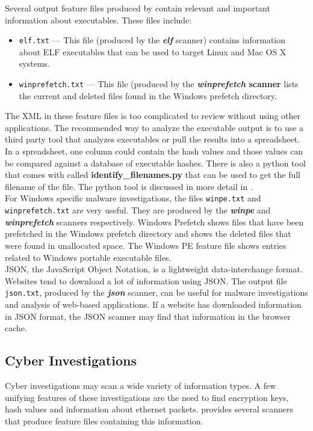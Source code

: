 \documentclass[11pt]{article} %
\begin{document}
Several output feature files produced by \bulk contain relevant and important information about executables. These files include:
\begin{itemize}
\item \texttt{elf.txt} --- This file (produced by the \textbf{\textit{elf}} scanner) contains information about ELF executables that can be used to target Linux and Mac OS X systems.
\item \texttt{winprefetch.txt} --- This file (produced by the \textbf{\textit{winprefetch} scanner} lists the current and deleted files found in the Windows prefetch directory.
\end{itemize}
The XML in these feature files is too complicated to review without using other applications. The recommended way to analyze the executable output is to use a third party tool that analyzes executables or pull the results into a spreadsheet. In a spreadsheet, one column could contain the hash values and those values can be compared against a database of executable hashes. There is also a python tool that comes with \bulk called \textbf{identify\_filenames.py} that can be used to get the full filename of the file. The python tool is discussed in more detail in \textbf{}.\\

For Windows specific malware investigations, the files \texttt{winpe.txt} and \texttt{winprefetch.txt} are very useful. They are produced by the \textbf{\textit{winpe}} and \textbf{\textit{winprefetch}} scanners respectively.  Windows Prefetch shows files that have been prefetched in the Windows prefetch directory and shows the deleted files that were found in unallocated space. The Windows PE feature file shows entries related to Windows portable executable files. \\

JSON, the JavaScript Object Notation, is a lightweight data-interchange format. Websites tend to download a lot of information using JSON. The output file \texttt{json.txt}, produced by the \textbf{\textit{json}} scanner, can be useful for malware investigations and analysis of web-based applications. If a website has downloaded information in JSON format, the JSON scanner may find that information in the browser cache. 

\subsection{Cyber Investigations}
\label{cyber}
Cyber investigations may scan a wide variety of information types. A few unifying features of these investigations are the need to find encryption keys, hash values and information about ethernet packets. \bulk provides several scanners that produce feature files containing this information.\\
\end{document}

